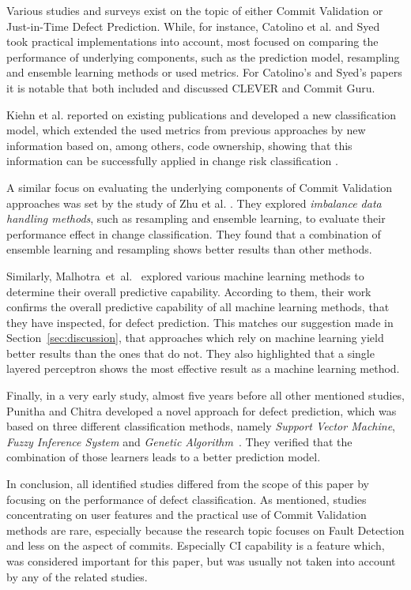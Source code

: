 Various studies and surveys exist
on the topic of either Commit Validation or Just-in-Time Defect Prediction. While, for instance, Catolino et al. \cite{Catolino2019} and Syed \cite{Syed2019} took practical implementations into account, most focused on comparing the performance of underlying components, such as the prediction model, resampling and ensemble learning methods or used metrics. For Catolino's and Syed's papers it is notable that both included and discussed CLEVER and Commit Guru.

Kiehn et al. reported on existing publications and developed a new classification model, which extended the used metrics from previous approaches by new information based on, among others, code ownership, showing that this information can be successfully applied in change risk classification \cite{Kiehn2019}.

A similar focus on evaluating the underlying components of Commit Validation approaches was set by the study of Zhu et al. \cite{Zhu2018}. They explored \textit{imbalance data handling methods}, such as resampling and ensemble learning, to evaluate their performance effect in change classification. They found that a combination of ensemble learning and resampling shows better results than other methods. 

Similarly, Malhotra~et~al.~\cite{Malhotra2017} explored various machine learning methods to determine their overall predictive capability. According to them, their work confirms the overall predictive capability of all machine learning methods, that they have inspected, for defect prediction. This matches our suggestion made in Section~\ref{sec:discussion}, that approaches which rely on machine learning yield better results than the ones that do not. They also highlighted that a single layered perceptron shows the most effective result as a machine learning method.

Finally, in a very early study, almost five years before all other mentioned studies, Punitha and Chitra developed a novel approach for defect prediction, which was based on three different classification methods, namely \textit{Support Vector Machine}, \textit{Fuzzy Inference System} and \textit{Genetic Algorithm}~\cite{Punitha2013}. They verified that the combination of those learners leads to a better prediction model.

In conclusion, all identified studies differed from the scope of this paper by focusing on the performance of defect classification. As mentioned, studies concentrating on user features and the practical use of Commit Validation methods are rare, especially because the research topic focuses on Fault Detection and less on the aspect of commits. Especially CI capability is a feature which, was considered important for this paper, but was usually not taken into account by any of the related studies.


